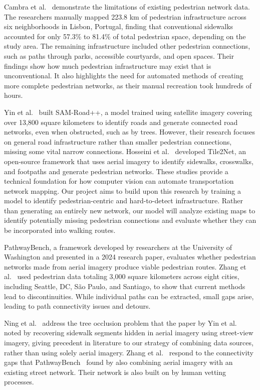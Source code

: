 \documentclass[conference]{IEEEtran}
\begin{document}
Cambra et al.~\cite{cambra2019} demonstrate the limitations of existing pedestrian network data. The researchers manually mapped 223.8 km of pedestrian infrastructure across six neighborhoods in Lisbon, Portugal, finding that conventional sidewalks accounted for only 57.3\% to 81.4\% of total pedestrian space, depending on the study area. The remaining infrastructure included other pedestrian connections, such as paths through parks, accessible courtyards, and open spaces. Their findings show how much pedestrian infrastructure may exist that is unconventional. It also highlights the need for automated methods of creating more complete pedestrian networks, as their manual recreation took hundreds of hours.

Yin et al.~\cite{yin2025} built SAM-Road++, a model trained using satellite imagery covering over 13,800 square kilometers to identify roads and generate connected road networks, even when obstructed, such as by trees. However, their research focuses on general road infrastructure rather than smaller pedestrian connections, missing some vital narrow connections. Hosseini et al.~\cite{hosseini2023} developed Tile2Net, an open-source framework that uses aerial imagery to identify sidewalks, crosswalks, and footpaths and generate pedestrian networks. These studies provide a technical foundation for how computer vision can automate transportation network mapping. Our project aims to build upon this research by training a model to identify pedestrian-centric and hard-to-detect infrastructure. Rather than generating an entirely new network, our model will analyze existing maps to identify potentially missing pedestrian connections and evaluate whether they can be incorporated into walking routes.

PathwayBench, a framework developed by researchers at the University of Washington and presented in a 2024 research paper, evaluates whether pedestrian networks made from aerial imagery produce viable pedestrian routes. Zhang et al.~\cite{zhang2024} used pedestrian data totaling 3,000 square kilometers across eight cities, including Seattle, DC, São Paulo, and Santiago, to show that current methods lead to discontinuities. While individual paths can be extracted, small gaps arise, leading to path connectivity issues and detours.

Ning et al.~\cite{ning2022} address the tree occlusion problem that the paper by Yin et al. ~\cite{yin2025} noted by recovering sidewalk segments hidden in aerial imagery using street-view imagery, giving precedent in literature to our strategy of combining data sources, rather than using solely aerial imagery. Zhang et al.~\cite{zhang2024prophet} respond to the connectivity gaps that PathwayBench~\cite{zhang2024} found by also combining aerial imagery with an existing street network. Their network is also built on by human vetting processes.
\end{document}
